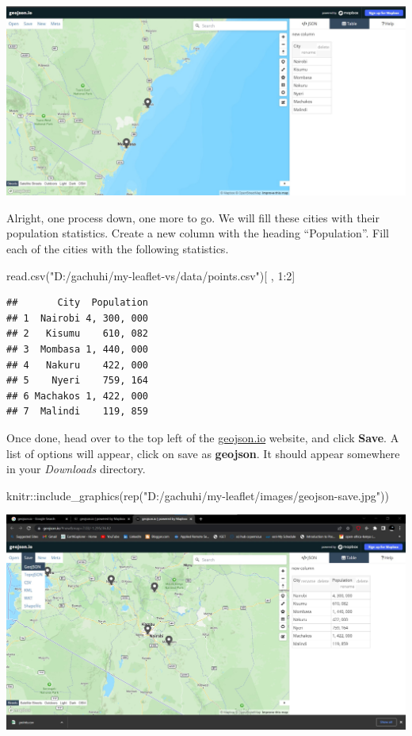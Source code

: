 \documentclass[
]{book}
\newenvironment{Shaded}{\begin{snugshade}}{\end{snugshade}}
\newcommand{\DecValTok}[1]{\textcolor[rgb]{0.00,0.00,0.81}{#1}}
\newcommand{\FunctionTok}[1]{\textcolor[rgb]{0.00,0.00,0.00}{#1}}
\newcommand{\NormalTok}[1]{#1}
\newcommand{\SpecialCharTok}[1]{\textcolor[rgb]{0.00,0.00,0.00}{#1}}
\newcommand{\StringTok}[1]{\textcolor[rgb]{0.31,0.60,0.02}{#1}}
\begin{document}
\includegraphics[width=26.6in]{../images/cities-named}

Alright, one process down, one more to go. We will fill these cities with their population statistics. Create a new column with the heading ``Population''. Fill each of the cities with the following statistics.

\begin{Shaded}
\begin{Highlighting}[]
\FunctionTok{read.csv}\NormalTok{(}\StringTok{"D:/gachuhi/my{-}leaflet{-}vs/data/points.csv"}\NormalTok{)[ , }\DecValTok{1}\SpecialCharTok{:}\DecValTok{2}\NormalTok{]}
\end{Highlighting}
\end{Shaded}

\begin{verbatim}
##       City  Population
## 1  Nairobi 4, 300, 000
## 2   Kisumu    610, 082
## 3  Mombasa 1, 440, 000
## 4   Nakuru    422, 000
## 5    Nyeri    759, 164
## 6 Machakos 1, 422, 000
## 7  Malindi    119, 859
\end{verbatim}

Once done, head over to the top left of the \href{http://geojson.io/}{geojson.io} website, and click \textbf{Save}. A list of options will appear, click on save as \textbf{geojson}. It should appear somewhere in your \emph{Downloads} directory.

\begin{Shaded}
\begin{Highlighting}[]
\NormalTok{knitr}\SpecialCharTok{::}\FunctionTok{include\_graphics}\NormalTok{(}\FunctionTok{rep}\NormalTok{(}\StringTok{"D:/gachuhi/my{-}leaflet/images/geojson{-}save.jpg"}\NormalTok{))}
\end{Highlighting}
\end{Shaded}

\includegraphics[width=26.67in]{../images/geojson-save}
\end{document}
